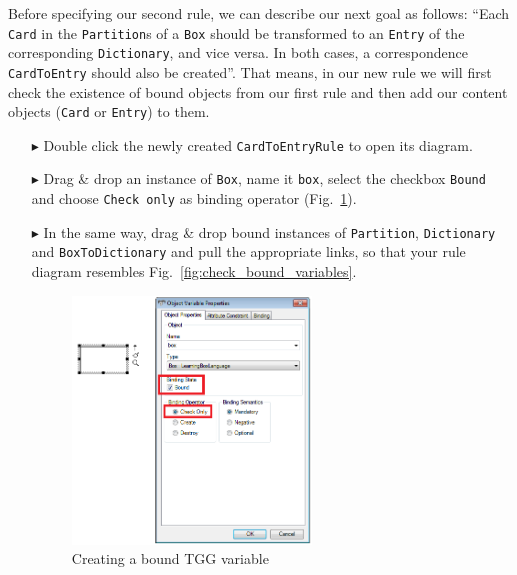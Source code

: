 Before specifying our second rule, we can describe our next goal as follows: ``Each \texttt{Card} in the \texttt{Partition}s of a \texttt{Box} should be transformed to an \texttt{Entry} of the corresponding \texttt{Dictionary}, and vice versa. 
In both cases, a correspondence \texttt{CardToEntry} should also be created''. 
That means, in our new rule we will first check the existence of bound objects from our first rule and then add our content objects (\texttt{Card} or \texttt{Entry}) to them.

\begin{enumerate}
\item[$\blacktriangleright$] Double click the newly created \texttt{CardToEntryRule} to open its diagram.
\item[$\blacktriangleright$] Drag \& drop an instance of \texttt{Box}, name it \texttt{box}, select the checkbox \texttt{Bound} and choose \texttt{Check only} as binding operator (Fig.~\ref{fig:bound_tgg_variable}).
\item[$\blacktriangleright$] In the same way, drag \& drop bound instances of \texttt{Partition}, \texttt{Dictionary} and \texttt{BoxToDictionary} and pull the appropriate links, so that your rule diagram resembles Fig.~\ref{fig:check_bound_variables}.

\begin{figure}[htbp]
\begin{center}
  \includegraphics[width=0.6\textwidth]{pics/tggBilder/tggRule/tgg17}
  \caption{Creating a bound TGG variable}  
  \label{fig:bound_tgg_variable}
\end{center}
\end{figure}


\end{enumerate}
